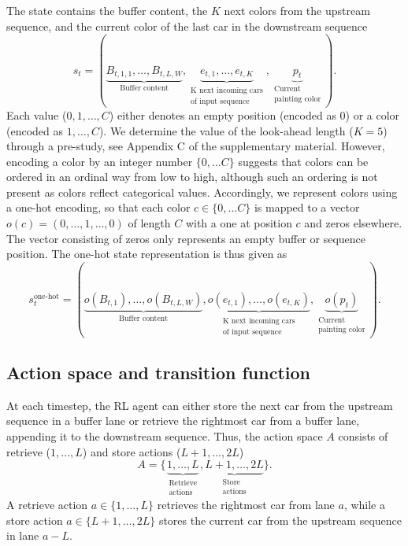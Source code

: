 \documentclass[11pt]{elsarticle}
\begin{document}
The state contains the buffer content, the $K$ next colors from the upstream sequence, and the current color of the last car in the downstream sequence
\begin{equation} \label{integer-state-representation}
s_t= (\underbrace{B_{t,1,1},\dots,B_{t,L,W}}_{\text{Buffer content}}, \underbrace{e_{t,1},\dots,e_{t,K}}_{\substack{ \text{K next incoming cars} \\ \text{of input sequence}}}, \underbrace{p_t}_{\substack{ \text{Current} \\ \text{painting color}}}).
\end{equation}
Each value ($0,1,\dots, C$) either denotes an empty position (encoded as 0) or a color (encoded as $1,\dots,C$). We determine the value of the look-ahead length ($K=5$) through a pre-study, see Appendix C of the supplementary material. However, encoding a color by an integer number $\{0,\dots C\}$ suggests that colors can be ordered in an ordinal way from low to high, although such an ordering is not present as colors reflect categorical values. Accordingly, we represent colors using a one-hot encoding, so that each color $c \in \{0,\dots C\}$ is mapped to a vector $o(c)=(0,\dots, 1, \dots,0)$ of length $C$ with a one at position $c$ and zeros elsewhere. The vector consisting of zeros only represents an empty buffer or sequence position. The one-hot state representation is thus given as 
\begin{equation}
s_t^{\text{one-hot}}= (\underbrace{o(B_{t,1}),\dots,o(B_{t,L,W})}_{\text{Buffer content}}, \underbrace{o(e_{t,1}),\dots,o(e_{t,K})}_{\substack{ \text{K next incoming cars} \\ \text{of input sequence}}}, \underbrace{o(p_t)}_{\substack{ \text{Current} \\ \text{painting color}}}). \label{one-hot-state-representation}
\end{equation}


\subsection{Action space and transition function}

At each timestep, the RL agent can either store the next car from the upstream sequence in a buffer lane or retrieve the rightmost car from a buffer lane, appending it to the downstream sequence. Thus, the action space $A$ consists of retrieve ($1,\dots,L$) and store actions ($L+1, \dots, 2L$)
\begin{equation} \label{state-space}
A = \{\underbrace{1,\dots, L}_{\substack{\text{Retrieve}\\ \text{actions}}}, \underbrace{L+1,\dots,2L}_{\substack{\text{Store}\\ \text{actions}}}  \}.
\end{equation}
A retrieve action $a \in \lbrace 1,\dots, L \rbrace$ retrieves the rightmost car from lane $a$, while a store action $a \in \lbrace L+1,\dots, 2L \rbrace$ stores the current car from the upstream sequence in lane $a-L$.
\end{document}
